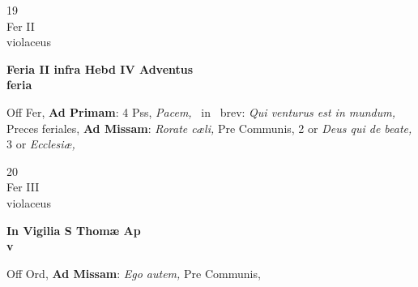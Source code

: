 \documentclass[10pt, openany]{book}
\begin{document}
        \begin{center}
            \begin{minipage}{3.5in}
                \vspace{2em}
                \begin{minipage}{0.5in}
                    {\Huge 19} \\
                    {\normalsize Fer II} \\
                    {\normalsize violaceus}
                \end{minipage}
                \begin{minipage}{3.0in}
                    \textbf{ \large Feria II infra Hebd IV Adventus \\
                    \textnormal{\normalsize feria}} \\ 
                \end{minipage}
                \begin{justify}Off Fer, \textbf{Ad Primam}: 4 Pss, \textit{Pacem,} \Vbar\ in \Rbar\ brev: \textit{Qui venturus est in mundum,} Preces feriales, \textbf{Ad Missam}: \textit{Rorate cæli,} Pre Communis, 2 or \textit{Deus qui de beate,} 3 or \textit{Ecclesiæ,}  
                \end{justify}
            \end{minipage}
        \end{center}
    
        \begin{center}
            \begin{minipage}{3.5in}
                \vspace{2em}
                \begin{minipage}{0.5in}
                    {\Huge 20} \\
                    {\normalsize Fer III} \\
                    {\normalsize violaceus}
                \end{minipage}
                \begin{minipage}{3.0in}
                    \textbf{ \large In Vigilia S Thomæ Ap \\
                    \textnormal{\normalsize v}} \\ 
                \end{minipage}
                \begin{justify}Off Ord, \textbf{Ad Missam}: \textit{Ego autem,} Pre Communis,  
                \end{justify}
            \end{minipage}
        \end{center}
    
\end{document}

